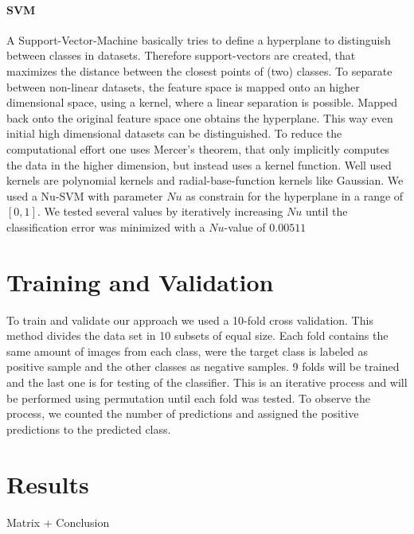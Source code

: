 \documentclass[a4paper,10pt]{article}
\begin{document}
\paragraph{SVM}
A Support-Vector-Machine basically tries to define a hyperplane to distinguish between classes in datasets. Therefore support-vectors are created, that maximizes the distance between the closest points of (two) classes. To separate between non-linear datasets, the feature space is mapped onto an higher dimensional space, using a kernel, where a linear separation is possible. Mapped back onto the original feature space one obtains the hyperplane. This way even initial high dimensional datasets can be distinguished. To reduce the computational effort one uses Mercer's theorem, that only implicitly computes the data in the higher dimension, but instead uses a kernel function. Well used kernels are polynomial kernels and radial-base-function kernels like Gaussian. We used a Nu-SVM with parameter $Nu$ as constrain for the hyperplane in a range of $[0,1]$. We tested several values by iteratively increasing $Nu$ until the classification error was minimized with a $Nu$-value of $0.00511$ 

\section{Training and Validation}
To train and validate our approach we used a 10-fold cross validation. 
This method divides the data set in 10 subsets of equal size. Each fold contains the same amount of images from each class, were the target class is labeled as positive sample and the other classes as negative samples. 9 folds will be trained and the last one is for testing of the classifier.
This is an iterative process and will be performed using permutation until each fold was tested.
To observe the process, we counted the number of predictions and assigned the positive predictions to the predicted class.
\section{Results}
Matrix + Conclusion 
\end{document}
